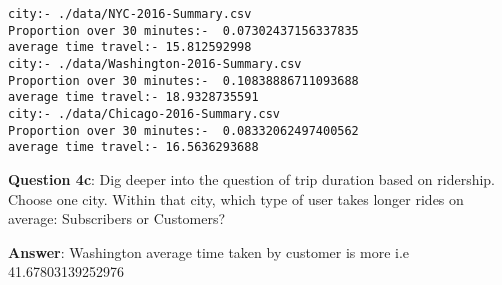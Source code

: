 \documentclass[11pt]{article}
\begin{document}
    \begin{Verbatim}[commandchars=\\\{\}]
city:- ./data/NYC-2016-Summary.csv
Proportion over 30 minutes:-  0.07302437156337835
average time travel:- 15.812592998
city:- ./data/Washington-2016-Summary.csv
Proportion over 30 minutes:-  0.10838886711093688
average time travel:- 18.9328735591
city:- ./data/Chicago-2016-Summary.csv
Proportion over 30 minutes:-  0.08332062497400562
average time travel:- 16.5636293688

    \end{Verbatim}

    \textbf{Question 4c}: Dig deeper into the question of trip duration
based on ridership. Choose one city. Within that city, which type of
user takes longer rides on average: Subscribers or Customers?

\textbf{Answer}: Washington average time taken by customer is more i.e
41.67803139252976
\end{document}
